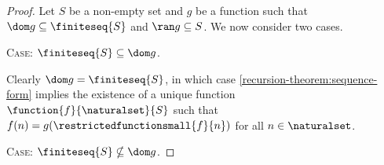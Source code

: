\begin{proof}
    Let \( S \) be a non-empty set and \( g \) be a function such that \( \dom g \subseteq \finiteseq{S} \) and \( \ran g \subseteq S \).
    We now consider two cases.

    \vspace{0.3cm}
    \noindent
    {\scshape Case}: \( \finiteseq{S} \subseteq \dom g \).

    \vspace{0.1cm}
    \noindent
    Clearly \( \dom g = \finiteseq{S} \), in which case
    \cref{recursion-theorem:sequence-form} implies the existence of a unique function \( \function{f}{\naturalset}{S} \) such that
    \( f(n) = g( \restrictedfunctionsmall{f}{n} ) \) for all \( n \in \naturalset \).

    \vspace{0.3cm}
    \noindent
    {\scshape Case}: \( \finiteseq{S} \nsubseteq \dom g \).


\end{proof}
